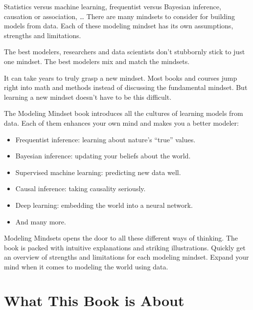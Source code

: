 \documentclass[
  10pt,
]{scrbook}
\providecommand{\tightlist}{%
  \setlength{\itemsep}{0pt}\setlength{\parskip}{0pt}}
\begin{document}
Statistics versus machine learning, frequentist versus Bayesian inference, causation or association, \ldots{}
There are many mindsets to consider for building models from data.
Each of these modeling mindset has its own assumptions, strengths and limitations.

The best modelers, researchers and data scientists don't stubbornly stick to just one mindset.
The best modelers mix and match the mindsets.

It can take years to truly grasp a new mindset.
Most books and courses jump right into math and methods instead of discussing the fundamental mindset.
But learning a new mindset doesn't have to be this difficult.

The Modeling Mindset book introduces all the cultures of learning models from data.
Each of them enhances your own mind and makes you a better modeler:

\begin{itemize}
\tightlist
\item
  Frequentist inference: learning about nature's ``true'' values.
\item
  Bayesian inference: updating your beliefs about the world.
\item
  Supervised machine learning: predicting new data well.
\item
  Causal inference: taking causality seriously.
\item
  Deep learning: embedding the world into a neural network.
\item
  And many more.
\end{itemize}

Modeling Mindsets opens the door to all these different ways of thinking.
The book is packed with intuitive explanations and striking illustrations.
Quickly get an overview of strengths and limitations for each modeling mindset.
Expand your mind when it comes to modeling the world using data.

\hypertarget{what-this-book-is-about}{%
\chapter{What This Book is About}\label{what-this-book-is-about}}
\end{document}
